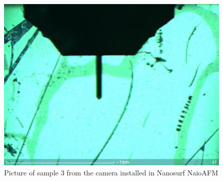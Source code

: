 \documentclass[11pt,a4paper]{article}
\begin{document}
\begin{figure}[H]
\centering
\includegraphics[scale=0.4]{sm_sample3_set}
\caption{Picture of sample 3 from the camera installed in Nanosurf NaioAFM}
\label{fig:sample3_light_green_cam}
\end{figure}
\end{document}
